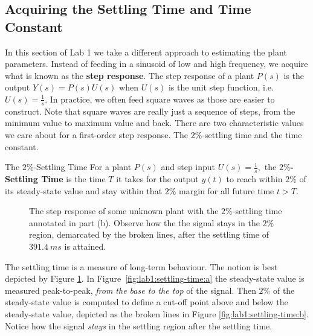 \subsection{Acquiring the Settling Time and Time Constant}
In this section of Lab 1 we take a different approach to estimating the plant
parameters. Instead of feeding in a sinusoid of low and high frequency, we
acquire what is known as the \textbf{step response}. The step response of
a plant \(P(s)\) is the output \(Y(s) = P(s) U(s)\) when \(U(s)\) is the unit
step function, i.e. \(U(s) = \frac{1}{s}.\) In practice, we often feed
square waves as those are easier to construct. Note that square waves are
really just a sequence of steps, from the minimum value to maximum value and
back.
%
There are two characteristic values we care about for a first-order step
response. The \(2\%\)-settling time and the time constant.
\begin{definition}[]{The \(2\%\)-Settling Time}
  For a plant \(P(s)\) and step input \(U(s) = \frac{1}{s},\)
  the \textbf{\(2\%\)-Settling Time} is the time \(T\) it takes for
  the output \(y(t)\) to reach within \(2\%\) of its steady-state value and
  stay within that \(2\%\) margin for all future time \(t > T.\)
\end{definition}
%
\begin{figure}
  \centering
  \hfill
  \caption[Step Response for a Linear Plant depicting Settling Time Measurements]{
    The step response of some unknown plant with the \(2\%\)-settling time
    annotated in part (b). Observe how the the signal stays in
    the \(2\%\) region, demarcated by the broken lines,
    after the settling time of \(\SI{391.4}{ms}\) is attained.
  }
  \label{fig:lab1:settling-time}
\end{figure}
%
The settling time is a measure of long-term behaviour.
The notion is best depicted by Figure
\ref{fig:lab1:settling-time}.
In Figure~\ref{fig:lab1:settling-time:a} the steady-state value is
measured peak-to-peak, \emph{from the base to the top} of the signal.
Then \(2\%\) of the
steady-state value is computed to define a cut-off point above and below the
steady-state value, depicted as the broken lines in Figure
\ref{fig:lab1:settling-time:b}. Notice how the signal \emph{stays} in the
settling region after the settling time.
